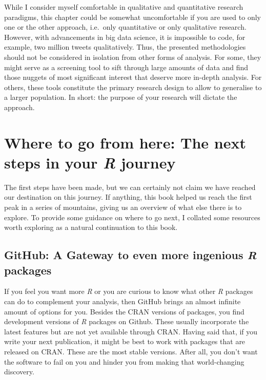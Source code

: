 \documentclass[
  letterpaper,
]{krantz}
\begin{document}
While I consider myself comfortable in qualitative and quantitative
research paradigms, this chapter could be somewhat uncomfortable if you
are used to only one or the other approach, i.e.~only quantitative or
only qualitative research. However, with advancements in big data
science, it is impossible to code, for example, two million tweets
qualitatively. Thus, the presented methodologies should not be
considered in isolation from other forms of analysis. For some, they
might serve as a screening tool to sift through large amounts of data
and find those nuggets of most significant interest that deserve more
in-depth analysis. For others, these tools constitute the primary
research design to allow to generalise to a larger population. In short:
the purpose of your research will dictate the approach.


\chapter{\texorpdfstring{Where to go from here: The next steps in your
\emph{R}
journey}{Where to go from here: The next steps in your R journey}}\label{next-steps}

The first steps have been made, but we can certainly not claim we have
reached our destination on this journey. If anything, this book helped
us reach the first peak in a series of mountains, giving us an overview
of what else there is to explore. To provide some guidance on where to
go next, I collated some resources worth exploring as a natural
continuation to this book.

\section{\texorpdfstring{GitHub: A Gateway to even more ingenious
\emph{R}
packages}{GitHub: A Gateway to even more ingenious R packages}}\label{next-steps-github}

If you feel you want more \emph{R} or you are curious to know what other
\emph{R} packages can do to complement your analysis, then GitHub brings
an almost infinite amount of options for you. Besides the CRAN versions
of packages, you find development versions of \emph{R} packages on
Github. These usually incorporate the latest features but are not yet
available through CRAN. Having said that, if you write your next
publication, it might be best to work with packages that are released on
CRAN. These are the most stable versions. After all, you don't want the
software to fail on you and hinder you from making that world-changing
discovery.
\end{document}
